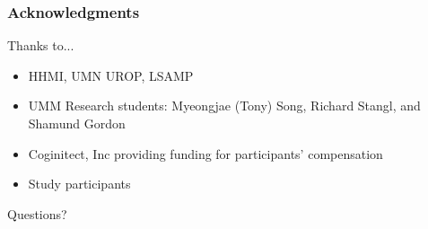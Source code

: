 \documentclass{beamer}
\begin{document}
\begin{frame}
\frametitle{Acknowledgments}
Thanks to...
	\begin{itemize}
	\item HHMI, UMN UROP, LSAMP 
	\item UMM Research students: Myeongjae (Tony) Song, Richard Stangl, and Shamund Gordon 
        \item Coginitect, Inc providing funding for participants' compensation 
	\item Study participants 
	\end{itemize}
	{\centering
	\noindent
	Questions? \par
	}
\end{frame}
\end{document}
